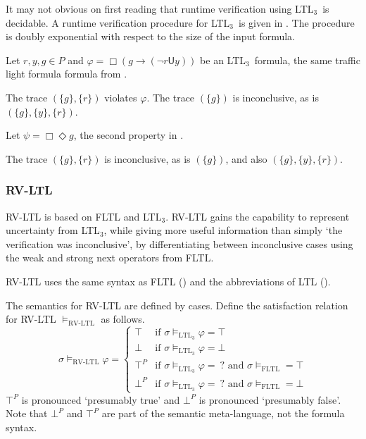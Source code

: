 \documentclass[a4paper]{article}
\newcommand{\U}{\mathsf{U}}
\newcommand{\tand}{\text{ and }}
\newcommand{\ltlt}{LTL$_3$}
\begin{document}
It may not obvious on first reading that runtime verification using \ltlt\ is decidable. A runtime verification procedure for \ltlt\ is given in \textcite[6]{arafat2005runtime}. The procedure is doubly exponential with respect to the size of the input formula.

\begin{eg}
Let $r,y,g\in P$ and $\varphi = \Box (g \to (\neg r \U y))$ be an \ltlt\ formula, the same traffic light formula formula from .

  The trace $(\{g\},\{r\})$ violates $\varphi$. The trace $(\{g\})$ is inconclusive, as is $(\{g\},\{y\},\{r\})$.

  Let $\psi = \Box \Diamond g $, the second property in .

  The trace $(\{g\},\{r\})$ is inconclusive, as is $(\{g\})$, and also $(\{g\},\{y\},\{r\})$.
\end{eg}

\subsubsection{RV-LTL} RV-LTL is based on FLTL and \ltlt. RV-LTL gains the capability to represent uncertainty from \ltlt, while giving more useful information than simply `the verification was inconclusive', by differentiating between inconclusive cases using the weak and strong next operators from FLTL.

RV-LTL uses the same syntax as FLTL () and the abbreviations of LTL ().

\begin{defn}\label{rvltlsem}

  The semantics for RV-LTL are defined by cases.
  Define the satisfaction relation for RV-LTL $\vDash_{\text{RV-LTL}}$ as follows.
  \[\sigma\vDash_{\text{RV-LTL}}\varphi =
    \begin{cases}
      \top & \text{if } \sigma \vDash_{\text{\ltlt}} \varphi = \top\\
      \bot & \text{if } \sigma \vDash_{\text{\ltlt}} \varphi = \bot\\
      \top^P & \text{if } \sigma \vDash_{\text{\ltlt}} \varphi = ~?\tand \sigma\vDash_{\text{FLTL}} = \top \\
      \bot^P & \text{if } \sigma \vDash_{\text{\ltlt}} \varphi = ~?\tand \sigma\vDash_{\text{FLTL}} = \bot
    \end{cases}
  \]
  $\top^P$ is pronounced `presumably true' and $\bot^P$ is pronounced `presumably false'.
  Note that $\bot^P$ and $\top^P$ are part of the semantic meta-language, not the formula syntax.
\end{defn}
\end{document}
